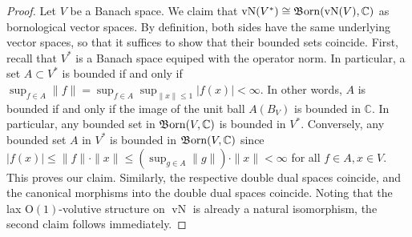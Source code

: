 \documentclass{article}
\newcommand{\Born}{\mathfrak{B}\hspace{-0.05cm}\operatorname{orn}}%
\newcommand{\vN}{\operatorname{vN}}%
\newcommand{\Oone}{\operatorname{O(1)}}
\numberwithin{equation}{section}
\theoremstyle{definition}
\theoremstyle{theorem}
\begin{document}
\begin{proof}
    Let $V$ be a Banach space. We claim that $\vN(V^*) \cong \Born(\vN(V),\mathbb{C})$ as bornological vector spaces. By definition, both sides 
    have the same underlying vector spaces, so that it suffices to show that their bounded sets coincide. First, recall that $V^*$ is a Banach space 
    equiped with the operator norm. In particular, a set $A \subset V^*$ is bounded if and only if 
    $\sup_{f \in A} \| f \| = \sup_{f \in A} \sup_{ \|x\| \leq 1} |f(x)| < \infty$. In other words, $A$ is bounded if and only if the image of the unit 
    ball $A(B_V)$ is bounded in $\mathbb{C}$. In particular, any bounded set in $\Born(V,\mathbb{C})$ is bounded in $V^*$. Conversely, any bounded set $A$
    in $V^*$ is bounded in $\Born(V,\mathbb{C})$ since $| f(x) | \leq \| f \| \cdot  \| x \|  \leq (\sup_{g \in A} \| g \|) \cdot \| x \| < \infty$ for all 
    $f \in A, x \in V$. This proves our claim. Similarly, the respective double dual spaces coincide, and the canonical morphisms into the double dual 
    spaces coincide. Noting that the lax $\Oone$-volutive structure on $\vN$ is already a natural isomorphism, the second claim follows immediately. 
\end{proof}
\end{document}

